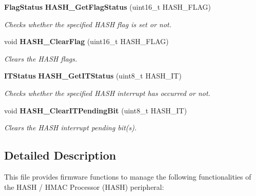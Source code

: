\begin{DoxyCompactItemize}
\textbf{ Flag\+Status} \textbf{ H\+A\+S\+H\+\_\+\+Get\+Flag\+Status} (uint16\+\_\+t H\+A\+S\+H\+\_\+\+F\+L\+AG)
\begin{DoxyCompactList}\small\item\em Checks whether the specified H\+A\+SH flag is set or not. \end{DoxyCompactList}\item 
void \textbf{ H\+A\+S\+H\+\_\+\+Clear\+Flag} (uint16\+\_\+t H\+A\+S\+H\+\_\+\+F\+L\+AG)
\begin{DoxyCompactList}\small\item\em Clears the H\+A\+SH flags. \end{DoxyCompactList}\item 
\textbf{ I\+T\+Status} \textbf{ H\+A\+S\+H\+\_\+\+Get\+I\+T\+Status} (uint8\+\_\+t H\+A\+S\+H\+\_\+\+IT)
\begin{DoxyCompactList}\small\item\em Checks whether the specified H\+A\+SH interrupt has occurred or not. \end{DoxyCompactList}\item 
void \textbf{ H\+A\+S\+H\+\_\+\+Clear\+I\+T\+Pending\+Bit} (uint8\+\_\+t H\+A\+S\+H\+\_\+\+IT)
\begin{DoxyCompactList}\small\item\em Clears the H\+A\+SH interrupt pending bit(s). \end{DoxyCompactList}\end{DoxyCompactItemize}


\subsection{Detailed Description}
This file provides firmware functions to manage the following functionalities of the H\+A\+SH / H\+M\+AC Processor (H\+A\+SH) peripheral\+: 

